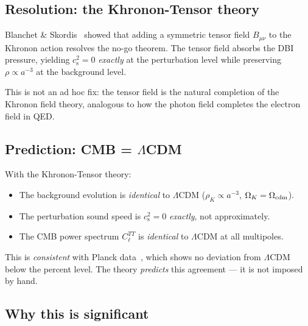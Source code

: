 \documentclass[prd,twocolumn,superscriptaddress,longbibliography,floatfix]{revtex4-2}
\newcommand{\cs}{c_{\mathrm{s}}}
\begin{document}
\subsection{Resolution: the Khronon-Tensor theory}
\label{sec:khronon_tensor}

Blanchet \& Skordis~\cite{BS2025} showed that adding a
symmetric tensor field $B_{\mu\nu}$ to the Khronon action resolves
the no-go theorem.  The tensor field absorbs the DBI pressure,
yielding $\cs^2 = 0$ \emph{exactly} at the perturbation level
while preserving $\rho \propto a^{-3}$ at the background level.

This is not an ad hoc fix: the tensor field is the natural completion
of the Khronon field theory, analogous to how the photon field
completes the electron field in QED.

\subsection{Prediction: CMB = \texorpdfstring{$\Lambda$CDM}{LCDM}}
\label{sec:cmb_prediction}

With the Khronon-Tensor theory:
\begin{itemize}
\item The background evolution is \emph{identical} to $\Lambda$CDM
  ($\rho_K \propto a^{-3}$, $\Omega_K = \Omega_{\rm cdm}$).
\item The perturbation sound speed is $\cs^2 = 0$ \emph{exactly},
  not approximately.
\item The CMB power spectrum $C_\ell^{TT}$ is \emph{identical}
  to $\Lambda$CDM at all multipoles.
\end{itemize}

This is \emph{consistent} with Planck data~\cite{Planck2018}, which
shows no deviation from $\Lambda$CDM below the percent level.  The
theory \emph{predicts} this agreement --- it is not imposed by hand.

\subsection{Why this is significant}
\label{sec:cmb_significance}
\end{document}
